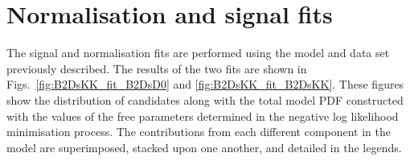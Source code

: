 



\section{Normalisation and signal fits}

The signal and normalisation fits are performed using the model and data set previously described. The results of the two fits are shown in Figs.~\ref{fig:B2DsKK_fit_B2DsD0} and \ref{fig:B2DsKK_fit_B2DsKK}. These figures show the distribution of \Bp candidates along with the total model PDF constructed with the values of the free parameters determined in the negative log likelihood minimisation process. The contributions from each different component in the model are superimposed, stacked upon one another, and detailed in the legends.

